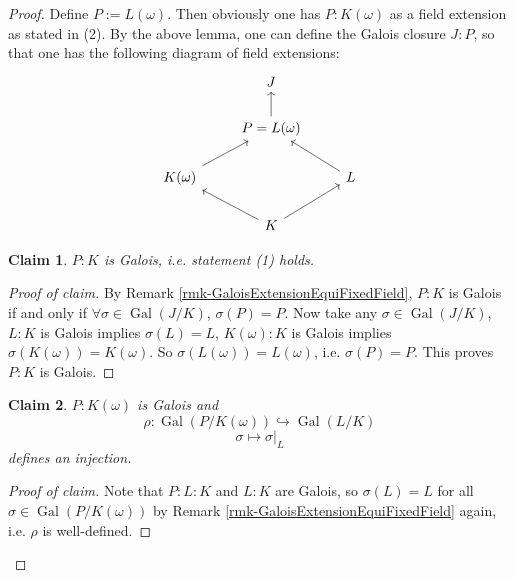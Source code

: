 \documentclass[11pt]{book}
\newtheorem*{claim}{Claim}
\begin{document}
\begin{proof}
    Define $P:= L(\omega)$. Then obviously one has $P:K(\omega)$ as a field extension as stated in (2). By the above lemma, one can define the Galois closure $J:P$, so that one has the following diagram of field extensions: 
    \[
        \begin{tikzcd}
            & J \\
            & P = L(\omega) \\
            {K(\omega)} && L \\
            & K
            \arrow[from=2-2, to=1-2]
            \arrow[from=3-1, to=2-2]
            \arrow[from=3-3, to=2-2]
            \arrow[from=4-2, to=3-1]
            \arrow[from=4-2, to=3-3]
        \end{tikzcd}
    \]
 
    \begin{claim}
        $P:K$ is Galois, i.e. statement (1) holds.
    \end{claim}

    \begin{proof}[Proof of claim]
        By Remark \ref{rmk-GaloisExtensionEquiFixedField}, $P:K$ is Galois if and only if $\forall \sigma\in \operatorname{Gal}(J /K)$, $\sigma(P)=P$. Now take any $\sigma\in \operatorname{Gal}(J /K)$, $L:K$ is Galois implies $\sigma(L)=L$, $K(\omega):K$ is Galois implies $\sigma(K(\omega))=K(\omega)$. So $\sigma(L(\omega))=L(\omega)$, i.e. $\sigma(P)=P$. This proves $P:K$ is Galois. 
    \end{proof}

    \begin{claim}
        $P:K(\omega)$ is Galois and 
        \[
        \rho:\operatorname{Gal}(P/K(\omega))\hookrightarrow \operatorname{Gal}(L /K)
        \]
        \[
        \sigma\mapsto \sigma|_{L}
        \]
        defines an injection. 
    \end{claim}
    \begin{proof}[Proof of claim]
        Note that $P:L:K$ and $L:K$ are Galois, so  $\sigma(L)=L$ for all $\sigma\in \operatorname{Gal}(P/K(\omega))$ by Remark \ref{rmk-GaloisExtensionEquiFixedField} again, i.e. $\rho$ is well-defined. 


\end{proof}
\end{proof}
\end{document}
